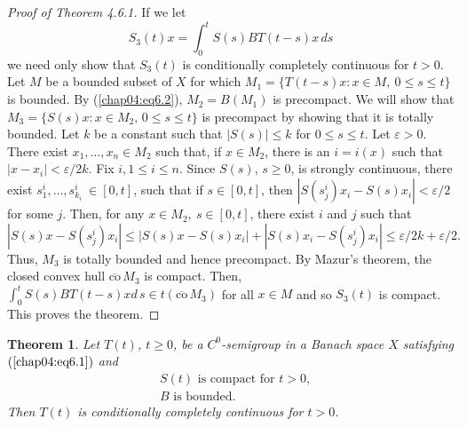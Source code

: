\documentclass{surv-l}
\theoremstyle{plain}
\newtheorem{theorem}{Theorem}[section]
\theoremstyle{definition}
\numberwithin{equation}{section}
\numberwithin{figure}{chapter}
\begin{document}
\begin{proof}[Proof of Theorem 4.6.1]\label{pot4.6.1}
If we let
\begin{equation*}
S_{3}(t)x=\int_{0}^{t}S(s)BT(t-s)x \,ds
\end{equation*}
we need only show that $S_{3}(t)$ is conditionally completely continuous for $t>0$. Let $M$ be a bounded subset of $X$ for which $M_{1}=\{T(t-s)x\!:x\in M,\ 0\leq s\leq t\}$ is bounded. By (\ref{chap04:eq6.2}), $M_{2}=B(M_{1})$ is precompact. We will show that $M_{3}=\{S(s)x\!:x\in M_{2}, \,0\leq s\leq t\}$ is precompact by showing that it is totally bounded. Let $k$ be a constant such that $|S(s)|\leq k$ for $0\leq s\leq t$. Let $\varepsilon >0$. There exist $x_{1}, \ldots,x_{n}\in M_{2}$ such that, if $x\in M_{2}$, there is an $i=i(x)$ such that $|x-x_{i}|<\varepsilon/2k$. Fix $i, 1\leq i\leq n$. Since $S(s)$, $s\geq 0$, is strongly continuous, there exist $s_{1}^{i},\ldots, s_{k_{i}}^{i}\ \in[0, t]$, such that if $s\in[0, t]$, then $|S(s_{j}^{i})x_{i}-S(s)x_{i}|<\varepsilon/2$ for some $j$. Then, for any $x\in M_{2},\ s\in[0, t]$, there exist $i$ and $j$ such that
\begin{equation*}
|S(s)x-S(s_{j}^{i})x_{i}|\leq|S(s)x-S(s)x_{i}|+|S(s)x_{i}-S(s_{j}^{i})x_{i}|\leq\varepsilon/2k+\varepsilon/2.
\end{equation*}
Thus, $M_{3}$ is totally bounded and hence precompact. By Mazur's theorem, the closed convex hull $\overline{\mathrm{co}}\,M_{3}$ is compact. Then, $\int_{0}^{t}S(s)BT(t-s)x d\,s\in t(\overline{\mathrm{co}}\, M_{3})$ for all $x\in M$ and so $S_{3}(t)$ is compact. This proves the theorem.
\end{proof}

\begin{theorem}\label{thm4.6.4} Let $T(t)$, $t\geq 0$, be a $C^{0}$-semigroup in a Banach space $X$ satisfying $(\ref{chap04:eq6.1})$ and
\setcounter{equation}{3}
\begin{align} \label{chap04:eq6.4}
&S(t)\text{ is compact for } t>0,\\
&B \text{ is bounded.}\label{chap04:eq6.5}
\end{align}
Then $T(t)$ is conditionally completely continuous for $t>0$.
\end{theorem}
\end{document}
